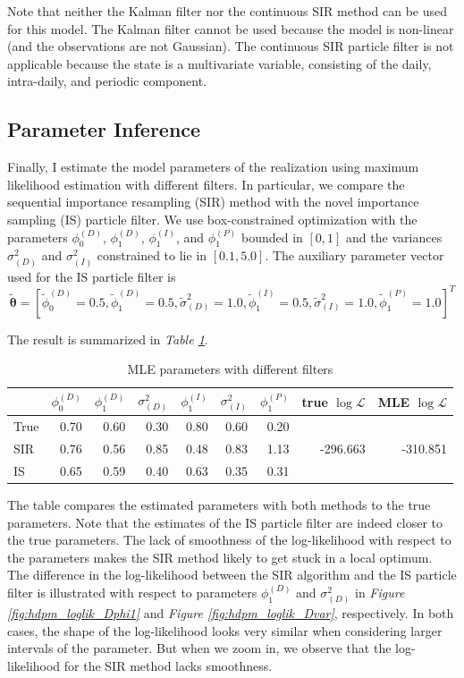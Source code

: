 \documentclass[11pt, oneside]{scrreprt}   	%
\begin{document}
Note that neither the Kalman filter nor the continuous SIR method can be used for this model. The Kalman filter cannot be used because the model is non-linear (and the observations are not Gaussian). The continuous SIR particle filter is not applicable because the state is a multivariate variable, consisting of the daily, intra-daily, and periodic component.\\

\subsection{Parameter Inference}
Finally, I estimate the model parameters of the realization using maximum likelihood estimation with different filters. In particular, we compare the sequential importance resampling (SIR) method with the novel importance sampling (IS) particle filter. We use box-constrained optimization with the parameters $\phi_0^{(D)}$,  $\phi_1^{(D)}$, $\phi_1^{(I)}$, and $\phi_1^{(P)}$ bounded in $[0,1]$ and the variances $\sigma^2_{(D)}$ and $\sigma^2_{(I)}$ constrained to lie in $[0.1, 5.0]$. The auxiliary parameter vector used for the IS particle filter is 
$$
\boldsymbol{\tilde{\theta}} = [ \tilde{\phi}_0^{(D)} = 0.5,  \tilde{\phi}_1^{(D)} = 0.5, \tilde{\sigma}^2_{(D)} = 1.0, \tilde{\phi}_1^{(I)} = 0.5, \tilde{\sigma}^2_{(I)} = 1.0, \tilde{\phi}_1^{(P)} = 1.0]^T
$$


The result is summarized in \textit{Table \ref{tab:hdpm_param_inference}}.\\  

\begin{table}[h!]
\centering
\begin{tabular}{l r r r r r r r r}
\hline
& $\phi_0^{(D)}$ &  $\phi_1^{(D)}$ & $\sigma^2_{(D)}$ & $\phi_1^{(I)}$ & $\sigma^2_{(I)}$ & $\phi_1^{(P)}$ & true $\log \mathcal{L} $ & MLE $\log \mathcal{L} $ \\
\hline
True        & 0.70  & 0.60 &  0.30 & 0.80 & 0.60 & 0.20&  &  \\
SIR         & 0.76  & 0.56  & 0.85 & 0.48 & 0.83 & 1.13 & -296.663 & -310.851 \\
IS            & 0.65  & 0.59  & 0.40 & 0.63 & 0.35 & 0.31 &  & \\
\hline
\end{tabular}
\caption{MLE parameters with different filters}
\label{tab:hdpm_param_inference}
\end{table}
The table compares the estimated parameters with both methods to the true parameters. Note that the estimates of the IS particle filter are indeed closer to the true parameters. The lack of smoothness of the log-likelihood with respect to the parameters makes the SIR method likely to get stuck in a local optimum. The difference in the log-likelihood between the SIR algorithm and the IS particle filter is illustrated with respect to parameters $\phi_1^{(D)}$ and $\sigma_{(D)}^2$ in \textit{Figure \ref{fig:hdpm_loglik_Dphi1}} and \textit{Figure \ref{fig:hdpm_loglik_Dvar}}, respectively. In both cases, the shape of the log-likelihood looks very similar when considering larger intervals of the parameter. But when we zoom in, we observe that the log-likelihood for the SIR method lacks smoothness. 
\end{document}

